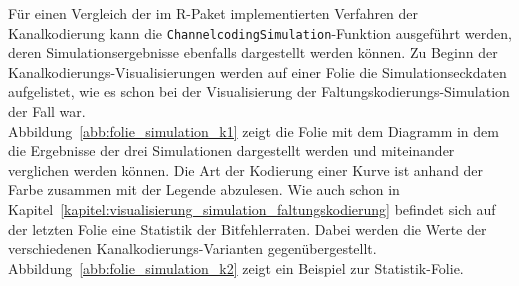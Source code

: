 Für einen Vergleich der im R-Paket implementierten Verfahren der Kanalkodierung kann die \texttt{ChannelcodingSimulation}-Funktion ausgeführt werden, deren Simulationsergebnisse ebenfalls dargestellt werden können. Zu Beginn der Kanalkodierungs-Visualisierungen werden auf einer Folie die Simulationseckdaten aufgelistet, wie es schon bei der Visualisierung der Faltungskodierungs-Simulation der Fall war.
\\
Abbildung~\ref{abb:folie_simulation_k1} zeigt die Folie mit dem Diagramm in dem die Ergebnisse der drei Simulationen dargestellt werden und miteinander verglichen werden können. Die Art der Kodierung einer Kurve ist anhand der Farbe zusammen mit der Legende abzulesen.
Wie auch schon in Kapitel~\ref{kapitel:visualisierung_simulation_faltungskodierung} befindet sich auf der letzten Folie eine Statistik der Bitfehlerraten. Dabei werden die Werte der verschiedenen Kanalkodierungs-Varianten gegenübergestellt. Abbildung~\ref{abb:folie_simulation_k2} zeigt ein Beispiel zur Statistik-Folie.
